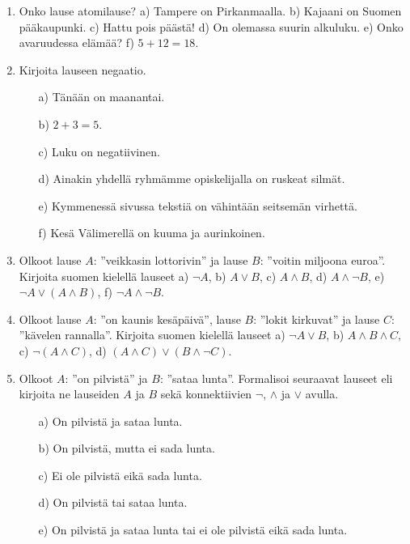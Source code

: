 \Harjoitustehtavat

\begin{enumerate}
\item Onko lause atomilause?
a) Tampere on Pirkanmaalla. b) Kajaani on Suomen pääkaupunki. c) Hattu pois päästä! d) On olemassa suurin alkuluku.
e) Onko avaruudessa elämää? f) $5 + 12 = 18$.

\item Kirjoita lauseen negaatio.
\begin{itemize}
\item[a)] Tänään on maanantai.
\item[b)] $2+3=5$.
\item[c)] Luku on negatiivinen.
\item[d)] Ainakin yhdellä ryhmämme opiskelijalla on ruskeat silmät.
\item[e)] Kymmenessä sivussa tekstiä on vähintään seitsemän virhettä.
\item[f)] Kesä Välimerellä on kuuma ja aurinkoinen.
\end{itemize}

\item Olkoot lause $A$: ''veikkasin lottorivin'' ja lause $B$: ''voitin miljoona euroa''. Kirjoita suomen kielellä lauseet
a) $\lnot A$, b) $A\lor B$, c) $A\land B$, d) $A\land \lnot B$,  
e) $\lnot A\lor (A\land B)$, f) $\lnot A\land \lnot B$.

\item
Olkoot lause $A$: ''on kaunis kesäpäivä'',  lause $B$: ''lokit kirkuvat'' ja lause $C$: ''kävelen rannalla''. Kirjoita suomen kielellä lauseet
a) $\lnot A\lor B$,
b) $A\land B \land C$, c)
$\lnot(A\land C)$,
d) $(A\land C)\lor (B\land
\lnot C)$.

\item Olkoot $A$: ''on pilvistä'' ja $B$: ''sataa
lunta''. Formalisoi seuraavat lauseet eli kirjoita ne
lauseiden $A$ ja $B$ sekä konnektiivien $\lnot$, $\land$
ja $\lor$ avulla.
\begin{itemize}
\item[a)] On pilvistä ja sataa lunta.
\item[b)] On pilvistä, mutta ei sada lunta.
\item[c)] Ei ole pilvistä eikä sada lunta.
\item[d)] On pilvistä tai sataa lunta.
\item[e)] On pilvistä ja sataa lunta tai ei ole pilvistä
eikä sada lunta.
\end{itemize}


\end{enumerate}
